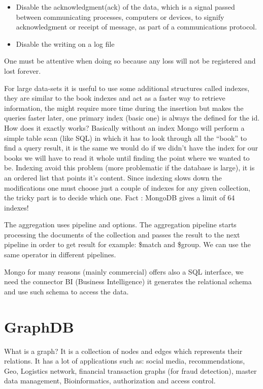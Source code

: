 \documentclass[a4page, 11pt]{article}
\begin{document}
\begin{itemize}[noitemsep]
	 
	\item
	Disable the acknowledgment(ack) of the data, which is a signal passed
	between communicating processes, computers or devices, to signify
	acknowledgment or receipt of message, as part of a communications
	protocol.
	\item
	Disable the writing on a log file
\end{itemize}

One must be attentive when doing so because any loss will not be
registered and lost forever.

For large data-sets it is useful to use some additional structures
called indexes, they are similar to the book indexes and act as a faster
way to retrieve information, the might require more time during the
insertion but makes the queries faster later, one primary index (basic
one) is always the defined for the id. How does it exactly works?
Basically without an index Mongo will perform a simple table scan (like
SQL) in which it has to look through all the ``book'' to find a query
result, it is the same we would do if we didn't have the index for our
books we will have to read it whole until finding the point where we
wanted to be. Indexing avoid this problem (more problematic if the
database is large), it is an ordered list that points it's content.
Since indexing slows down the modifications one must choose just a
couple of indexes for any given collection, the tricky part is to decide
which one. Fact : MongoDB gives a limit of 64 indexes!

The aggregation uses pipeline and options. The aggregation pipeline
starts processing the documents of the collection and passes the result
to the next pipeline in order to get result for example: \$match and
\$group. We can use the same operator in different pipelines.

Mongo for many reasons (mainly commercial) offers also a SQL interface,
we need the connector BI (Business Intelligence) it generates the
relational schema and use such schema to access the data.

\section{GraphDB}

What is a graph? It is a collection of nodes and edges which represents their relations. 
It has a lot of applications such as: social media, recommendations, Geo, Logistics network, financial transaction graphs (for fraud detection), master data management, Bioinformatics, authorization and access control.
\end{document}
